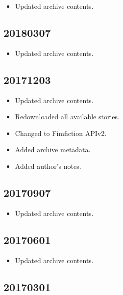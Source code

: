 \documentclass[hidelinks,a4paper,12pt]{article}
\begin{document}
\begin{itemize}
\item Updated archive contents.
\end{itemize}

\subsection{20180307}  \label{sec:changelog_20180307}

\begin{itemize}
\item Updated archive contents.
\end{itemize}

\subsection{20171203}  \label{sec:changelog_20171203}

\begin{itemize}
\item Updated archive contents.
\item Redownloaded all available stories.
\item Changed to Fimfiction APIv2.
\item Added archive metadata.
\item Added author's notes.
\end{itemize}

\subsection{20170907}  \label{sec:changelog_20170907}

\begin{itemize}
\item Updated archive contents.
\end{itemize}

\subsection{20170601}  \label{sec:changelog_20170601}

\begin{itemize}
\item Updated archive contents.
\end{itemize}

\subsection{20170301}  \label{sec:changelog_20170301}
\end{document}
